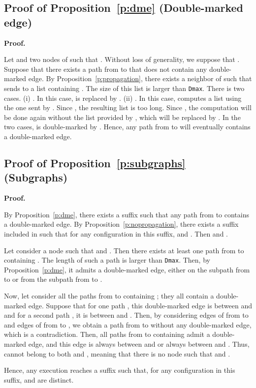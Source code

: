 \documentclass[11pt,english]{article}
\newenvironment{proof}[1][0cm]{
  \begin{list}{\bf Proof.~}{
      \setlength{\itemindent}{0cm}
      \setlength{\labelsep}{0cm}
      \setlength{\labelwidth}{#1}
      \setlength{\leftmargin}{#1}
    \item
    }
}{\hfill
  \end{list}
}
\begin{document}
\subsection{Proof of Proposition~\ref{p:dme} (Double-marked edge)}

\begin{proof}
  Let  and  two nodes of  such that . Without loss
  of generality, we suppose that . Suppose that there exists a
  path from  to  that does not contain any double-marked edge. By
  Proposition~\ref{p:propagation}, there exists a neighbor  of  such that
   sends to  a list containing . The size of this list is larger than
  \texttt{Dmax}. There is two cases.
(i) . In this case,  is
    replaced by .
(ii) . In this case,  computes a list using the
    one sent by . Since , the resulting list is too
    long. Since , the computation will be done again without the
    list provided by , which will be replaced by
    .
In the two cases,  is double-marked by . Hence, any path from  to 
  will eventually contains a double-marked edge.
\end{proof}

\subsection{Proof of Proposition~\ref{p:subgraphs} (Subgraphs)}

\begin{proof}
  By Proposition~\ref{p:dme}, there exists a suffix  such that any path
  from  to  contains a double-marked edge. By
  Proposition~\ref{p:nopropagation}, there exists a suffix  included in
   such that for any configuration  in this suffix,  and . Then  and
  .

  Let consider a node  such that  and . Then there
  exists at least one path from  to  containing . The length of such a
  path is larger than \texttt{Dmax}. Then, by Proposition~\ref{p:dme}, it
  admits a double-marked edge, either on the subpath from  to  or from the
  subpath from  to .

  Now, let consider all the paths from  to  containing ; they all
  contain a double-marked edge. Suppose that for one path , this double-marked edge is between  and  and for a second path , it is between
   and . Then, by considering edges of  from  to  and edges of
   from  to , we obtain a path from  to  without any double-marked edge, which is a contradiction. Then, all paths from  to 
  containing  admit a double-marked edge, and this edge is always between 
  and  or always between  and . Thus,  cannot belong to both 
  and , meaning that there is no node  such that  and .

  Hence, any execution reaches a suffix such that, for any configuration  in
  this suffix,  and  are distinct.
\end{proof} 
\end{document}
